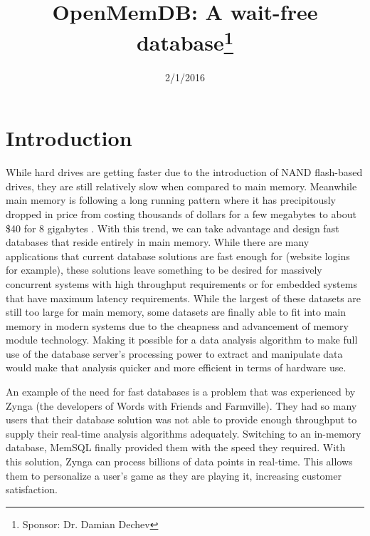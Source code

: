 \documentclass[conference, compsoc]{IEEEtran}
\begin{document}
\title{OpenMemDB: A wait-free database\thanks{Sponsor: Dr. Damian Dechev}}
\author{
 \and 
{} \and 
{} \and 
{}
}

\date{2/1/2016}

\maketitle
\newpage


\section{Introduction}
While hard drives are getting faster due to the introduction of NAND flash-based drives,
they are still relatively slow when compared to main memory. Meanwhile main memory is 
following a long running pattern where it has precipitously dropped in price from costing 
thousands of dollars for a few megabytes to about \$40 for 8 gigabytes \cite{jcmit}. 
With this trend, we can take advantage and design fast databases that reside entirely in main memory. While there are many 
applications that current database solutions are fast enough for (website logins for 
example), these solutions leave something to be desired for massively concurrent 
systems with high throughput requirements or for embedded systems that have maximum latency 
requirements. While the largest of these datasets are still too large for main memory, 
some datasets are finally able to fit into main memory in modern systems due to the 
cheapness and advancement of memory module technology. Making it possible for a data 
analysis algorithm to make full use of the database server's processing power to extract 
and manipulate data would make that analysis quicker and more efficient in terms of hardware use.
\par\vspace{\baselineskip}
An example of the need for fast databases is a problem that was experienced by Zynga 
(the developers of Words with Friends and Farmville). They had so many users that their 
database solution was not able to provide enough throughput to supply their real-time 
analysis algorithms adequately. Switching to an in-memory database, MemSQL finally 
provided them with the speed they required. With this solution, Zynga can process 
billions of data points in real-time. This allows them to personalize a user's game 
as they are playing it, increasing customer satisfaction.
\end{document}
